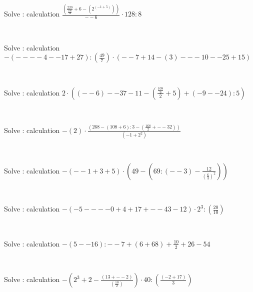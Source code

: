 \documentclass[english,course]{lecture}
\begin{document}
\begin{enumerate}
\begin{minipage}{\linewidth}
\item Solve : calculation 
\(\frac{\left(\frac{220}{\frac{100}{10}}+6-\left({2}^{\left(-1+5\right)}\right)\right)}{--6} \cdot 128:8\)
\end{minipage} \\
\begin{minipage}{\linewidth}
\item Solve : calculation 
\(-\left(----4--17+27\right):\left(\frac{49}{7}\right) \cdot \left(--7+14-\left(3\right)---10--25+15\right)\)
\end{minipage} \\
\begin{minipage}{\linewidth}
\item Solve : calculation 
\(2 \cdot \left(\left(--6\right)--37-11-\left(\frac{\frac{108}{9}}{2}+5\right)+\left(-9--24\right):5\right)\)
\end{minipage} \\
\begin{minipage}{\linewidth}
\item Solve : calculation 
\(-\left(2\right) \cdot \frac{\left(268-\left(108+6\right):3-\left(\frac{168}{2}+--32\right)\right)}{\left(-1+{2}^{2}\right)}\)
\end{minipage} \\
\begin{minipage}{\linewidth}
\item Solve : calculation 
\(-\left(--1+3+5\right) \cdot \left(49-\left(69:\left(--3\right)-\frac{12}{{\left(\frac{6}{3}\right)}^{2}}\right)\right)\)
\end{minipage} \\
\begin{minipage}{\linewidth}
\item Solve : calculation 
\(-\left(-5----0+4+17+--43-12\right) \cdot {2}^{3}:\left(\frac{20}{10}\right)\)
\end{minipage} \\
\begin{minipage}{\linewidth}
\item Solve : calculation 
\(-\left(5--16\right):--7+\left(6+68\right)+\frac{10}{2}+26-54\)
\end{minipage} \\
\begin{minipage}{\linewidth}
\item Solve : calculation 
\(-\left({2}^{3}+2-\frac{\left(13+--2\right)}{\left(\frac{10}{2}\right)}\right) \cdot 40:\left(\frac{\left(-2+17\right)}{3}\right)\)

\end{minipage}
\end{enumerate}
\end{document}
